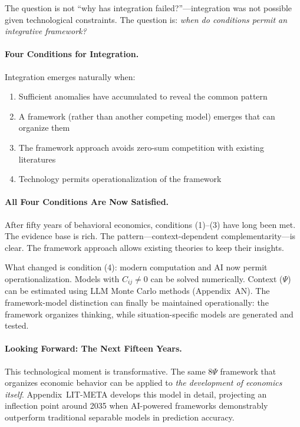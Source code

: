 The question is not ``why has integration failed?''---integration was not possible given technological constraints. The question is: \emph{when do conditions permit an integrative framework?}

\paragraph{Four Conditions for Integration.}
Integration emerges naturally when:
\begin{enumerate}
    \item Sufficient anomalies have accumulated to reveal the common pattern
    \item A framework (rather than another competing model) emerges that can organize them
    \item The framework approach avoids zero-sum competition with existing literatures
    \item Technology permits operationalization of the framework
\end{enumerate}

\paragraph{All Four Conditions Are Now Satisfied.}
After fifty years of behavioral economics, conditions (1)--(3) have long been met. The evidence base is rich. The pattern---context-dependent complementarity---is clear. The framework approach allows existing theories to keep their insights.

What changed is condition (4): modern computation and AI now permit operationalization. Models with $C_{ij} \neq 0$ can be solved numerically. Context ($\Psi$) can be estimated using LLM Monte Carlo methods (Appendix~AN). The framework-model distinction can finally be maintained operationally: the framework organizes thinking, while situation-specific models are generated and tested.

\paragraph{Looking Forward: The Next Fifteen Years.}
This technological moment is transformative. The same 8$\Psi$ framework that organizes economic behavior can be applied to \emph{the development of economics itself}. Appendix~LIT-META develops this model in detail, projecting an inflection point around 2035 when AI-powered frameworks demonstrably outperform traditional separable models in prediction accuracy.

